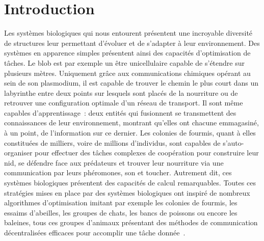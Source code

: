 \chapter*{Introduction}

Les systèmes biologiques qui nous entourent présentent une incroyable diversité de structures leur permettant d'évoluer et de s'adapter à leur environnement.
Des systèmes en apparence simples présentent ainsi des capacités d'optimisation de tâches. Le blob est par exemple un être unicellulaire capable de s'étendre sur plusieurs mètres. Uniquement grâce aux communications chimiques opérant au sein de son plasmodium, il est capable de trouver le chemin le plus court dans un labyrinthe entre deux points sur lesquels sont placés de la nourriture \cite{Nakagaki2000IntelligenceMB} ou de retrouver une configuration optimale d'un réseau de transport. Il sont même capables d'apprentissage~: deux entités qui fusionnent se transmettent des connaissances de leur environnement, montrant qu'elles ont chacune emmagasiné, à un point, de l'information sur ce dernier.
Les colonies de fourmis, quant à elles constituées de milliers, voire de millions d'individus, sont capables de s'auto-organiser pour effectuer des tâches complexes de coopération pour construire leur nid, se défendre face aux prédateurs et trouver leur nourriture via une communication par leurs phéromones, son et toucher.
Autrement dit, ces systèmes biologiques présentent des capacités de calcul remarquables. 
Toutes ces stratégies mises en place par des systèmes biologiques ont inspiré de nombreux algorithmes d'optimisation imitant par exemple les colonies de fourmis, les essaims d'abeilles, les groupes de chats, les bancs de poissons ou encore les baleines, tous ces groupes d'animaux présentant des méthodes de communication décentralisées efficaces pour accomplir une tâche donnée~\cite{Darwish2018BioinspiredCA}.

